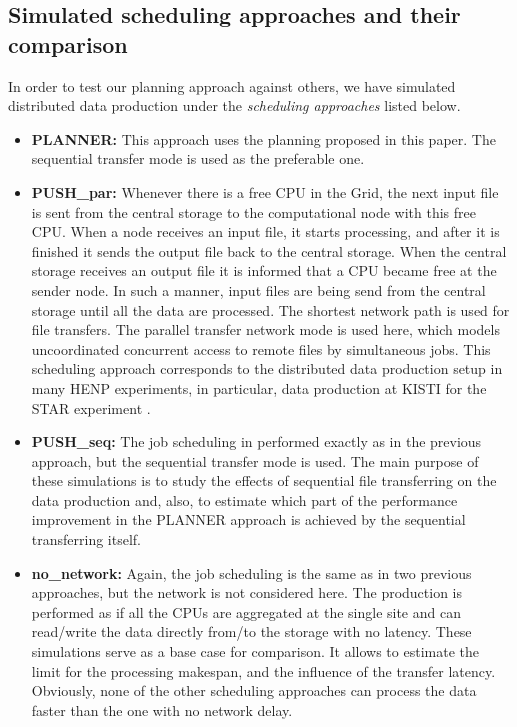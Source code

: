\documentclass{svjour3}                     %
\begin{document}
\subsection{Simulated scheduling approaches and their comparison}
In order to test our planning approach against others, we have simulated distributed data production under the \textit{scheduling approaches} listed below. 
\begin{itemize}
\label{scenarios}
\item \textbf{PLANNER:}  This approach uses the planning proposed in this paper. The sequential transfer mode is used as the preferable one. 
\item \textbf{PUSH\_par:} Whenever there is a free CPU in the Grid, the next input file is sent from the central storage to the computational node with this free CPU. When a node receives an input file, it starts processing, and after it is finished it sends the output file back to the central storage. When the central storage receives an output file it is informed that a CPU became free at the sender node. In such a manner, input files are being send from the central storage until all the data are processed. The shortest network path is used for file transfers. The parallel transfer network mode is used here, which models uncoordinated concurrent access to remote files by simultaneous jobs. This scheduling approach corresponds to the distributed data production setup in many HENP experiments, in particular, data production at KISTI for the STAR experiment \cite{KISTI-production}. 
\item \textbf{PUSH\_seq:} The job scheduling in performed exactly as in the previous approach, but the sequential transfer mode is used. The main purpose of these simulations is to study the effects of sequential file transferring on the data production and, also, to estimate which part of the performance improvement in the PLANNER approach is achieved by the sequential transferring itself.
\item \textbf{no\_network:} Again, the job scheduling is the same as in two previous approaches, but the network is not considered here. The production is performed as if all the CPUs are aggregated at the single site and can read/write the data directly from/to the storage with no latency. These simulations serve as a base case for comparison. It allows to estimate the limit for the processing makespan, and the influence of the transfer latency. Obviously, none of the other scheduling approaches can process the data faster than the one with no network delay.
\end{itemize}
\end{document}

